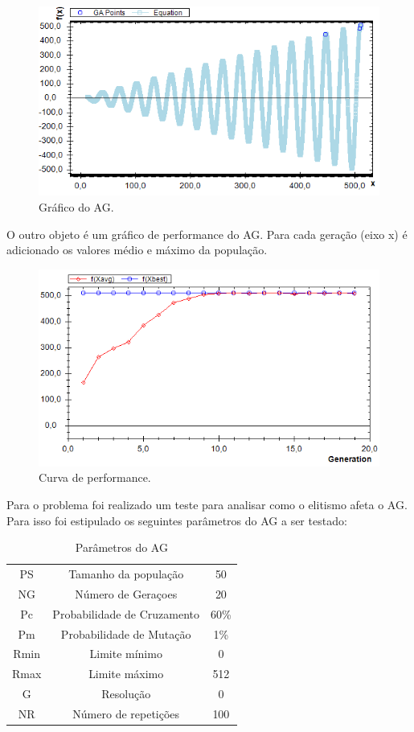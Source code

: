 \documentclass[twoside]{article}
\begin{document}
\begin{multicols}{2}
\begin{figure}[H]
\label{fig:graphicview}
  \caption{Gráfico do AG.}
  \centering
    \includegraphics[scale = 0.47]{genetic_algorithm_plot.png}
\end{figure}

O outro objeto é um gráfico de performance do AG. Para cada geração (eixo x) é adicionado os valores médio e máximo da população.

\begin{figure}[H]
\label{fig:graphicview}
  \caption{Curva de performance.}
  \centering
    \includegraphics[scale = 0.47]{performance_curve.png}
\end{figure}

Para o problema foi realizado um teste para analisar como o elitismo afeta o AG. Para isso foi estipulado os seguintes parâmetros do AG a ser testado:

\begin{table}[H]
\label{tab:popinfo}
\caption{Parâmetros do AG}
\centering
\begin{tabular}{ccc}
\toprule
PS & Tamanho da população & 50\\
NG & Número de Geraçoes & 20\\
Pc & Probabilidade de Cruzamento & 60\%\\
Pm & Probabilidade de Mutação & 1\%\\
Rmin & Limite mínimo & 0\\
Rmax & Limite máximo & 512\\
G & Resolução & 0\\
NR & Número de repetições & 100\\
\bottomrule
\end{tabular}
\end{table}


\end{multicols}
\end{document}
